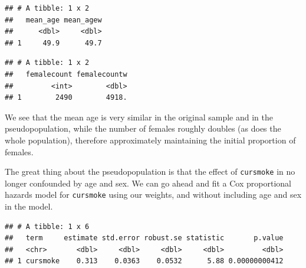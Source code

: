 \documentclass[
]{book}
\newenvironment{Shaded}{\begin{snugshade}}{\end{snugshade}}
\newcommand{\CommentTok}[1]{\textcolor[rgb]{0.56,0.35,0.01}{\textit{#1}}}
\newcommand{\DataTypeTok}[1]{\textcolor[rgb]{0.13,0.29,0.53}{#1}}
\newcommand{\DecValTok}[1]{\textcolor[rgb]{0.00,0.00,0.81}{#1}}
\newcommand{\KeywordTok}[1]{\textcolor[rgb]{0.13,0.29,0.53}{\textbf{#1}}}
\newcommand{\NormalTok}[1]{#1}
\newcommand{\OperatorTok}[1]{\textcolor[rgb]{0.81,0.36,0.00}{\textbf{#1}}}
\newcommand{\StringTok}[1]{\textcolor[rgb]{0.31,0.60,0.02}{#1}}
\begin{document}
\begin{verbatim}
## # A tibble: 1 x 2
##   mean_age mean_agew
##      <dbl>     <dbl>
## 1     49.9      49.7
\end{verbatim}

\begin{Shaded}
\end{Shaded}

\begin{verbatim}
## # A tibble: 1 x 2
##   femalecount femalecountw
##         <int>        <dbl>
## 1        2490        4918.
\end{verbatim}

We see that the mean age is very similar in the original sample and in the pseudopopulation, while the number of females roughly doubles (as does the whole population), therefore approximately maintaining the initial proportion of females.

The great thing about the pseudopopulation is that the effect of \texttt{cursmoke} in no longer confounded by age and sex.
We can go ahead and fit a Cox proportional hazards model for \texttt{cursmoke} using our weights, and without including age and sex in the model.

\begin{Shaded}
\end{Shaded}

\begin{verbatim}
## # A tibble: 1 x 6
##   term     estimate std.error robust.se statistic       p.value
##   <chr>       <dbl>     <dbl>     <dbl>     <dbl>         <dbl>
## 1 cursmoke    0.313    0.0363    0.0532      5.88 0.00000000412
\end{verbatim}
\end{document}
